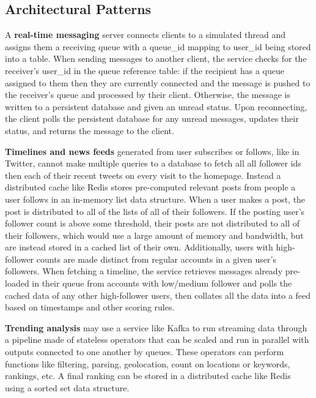 \documentclass{article}
\begin{document}
\subsection{Architectural Patterns}
    
    A \textbf{real-time messaging} server connects clients to a simulated thread and assigns them a receiving queue with a queue\_id mapping to user\_id  being stored into a table. When sending messages to another client, the service checks for the receiver's user\_id in the queue reference table: if the recipient has a queue assigned to them then they are currently connected and the message is pushed to the receiver's queue and processed by their client. Otherwise, the message is written to a persistent database and given an unread status. Upon reconnecting, the client polls the persistent database for any unread messages, updates their status, and returns the message to the client.

    \textbf{Timelines and news feeds} generated from user subscribes or follows, like in Twitter, cannot make multiple queries to a database to fetch all all follower ids then each of their recent tweets on every visit to the homepage. Instead a distributed cache like Redis stores pre-computed relevant posts from people a user follows in an in-memory list data structure. When a user makes a post, the post is distributed to all of the lists of all of their followers. If the posting user's follower count is above some threshold, their posts are not distributed to all of their followers, which would use a large amount of memory and bandwidth, but are instead stored in a cached list of their own. Additionally, users with high-follower counts are made distinct from regular accounts in a given user's followers. When fetching a timeline, the service retrieves messages already pre-loaded in their queue from accounts with low/medium follower and polls the cached data of any other high-follower users, then collates all the data into a feed based on timestamps and other scoring rules.
    
    \textbf{Trending analysis} may use a service like Kafka to run streaming data through a pipeline made of stateless operators that can be scaled and run in parallel with outputs connected to one another by queues. These operators can perform functions like filtering, parsing, geolocation, count on locations or keywords, rankings, etc. A final ranking can be stored in a distributed cache like Redis using a sorted set data structure.
    
\end{document}
